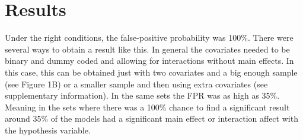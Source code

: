 \section{Results} 
Under the right conditions, the false-positive probability was 100\%. There were several ways to obtain a result like this. In general the covariates needed to be binary and dummy coded and allowing for interactions without main effects. In this case, this can be obtained just with two covariates and a big enough sample (see Figure 1B) or a smaller sample and then using extra covariates (see supplementary information). In the same sets the FPR was as high as 35\%. Meaning in the sets where there was a 100\% chance to find a significant result around 35\% of the models had a significant main effect or interaction affect with the hypothesis variable. 

